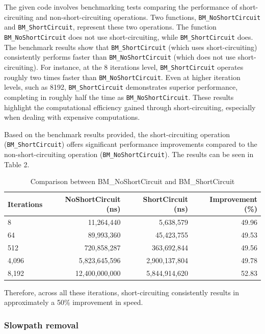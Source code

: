 \documentclass{article}
\theoremstyle{break}
\begin{document}
The given code involves benchmarking tests comparing the performance of short-circuiting and non-short-circuiting operations. Two functions, \texttt{BM\_NoShortCi\-rcuit} and \texttt{BM\_ShortCircuit}, represent these two operations. The function \texttt{BM\_NoSh\-ortCircuit} does not use short-circuiting, while \texttt{BM\_ShortCircuit} does. The benchmark results show that \texttt{BM\_ShortCircuit} (which uses short-circuiting) consistently performs faster than \texttt{BM\_NoShortCircuit} (which does not use short-circuiting). For instance, at the 8 iterations level, \texttt{BM\_ShortCircuit} operates roughly two times faster than \texttt{BM\_NoShortCircuit}. Even at higher iteration levels, such as 8192, \texttt{BM\_Short\-Circuit} demonstrates superior performance, completing in roughly half the time as \texttt{BM\_NoSh\-ortCircuit}. These results highlight the computational efficiency gained through short-circuiting, especially when dealing with expensive computations.

Based on the benchmark results provided, the short-circuiting operation (\texttt{BM\_S\-hortCircuit}) offers significant performance improvements compared to the non-short-circuiting operation (\texttt{BM\_NoShortCircuit}). The results can be seen in Table 2.


\begin{table}[H]
\centering
\begin{tabular}{lrrr}
\toprule
\textbf{Iterations} & \textbf{NoShortCircuit (ns)} & \textbf{ShortCircuit (ns)} & \textbf{Improvement (\%)} \\
\midrule
8     & 11,264,440 & 5,638,579  & 49.96 \\
64    & 89,993,360 & 45,423,755 & 49.53 \\
512   & 720,858,287 & 363,692,844 & 49.56 \\
4,096 & 5,823,645,596 & 2,900,137,804 & 49.78 \\
8,192 & 12,400,000,000 & 5,844,914,620 & 52.83 \\
\bottomrule
\end{tabular}
\caption{Comparison between BM\_NoShortCircuit and BM\_ShortCircuit}
\label{tab:comparison}
\end{table}


Therefore, across all these iterations, short-circuiting consistently results in approximately a 50\% improvement in speed.



\subsubsection*{Slowpath removal}
\end{document}
